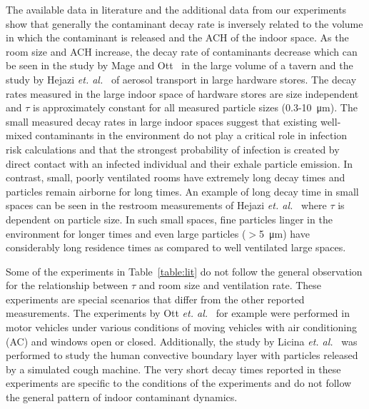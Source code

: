 \documentclass[preprint]{elsarticle}
\begin{document}
The available data in literature and the additional data from our experiments show that generally the contaminant decay rate is inversely related to the volume in which the contaminant is released and the ACH of the indoor space.
As the room size and ACH increase, the decay rate of contaminants decrease which can be seen in the study by Mage and Ott~\cite{Mage1996} in the large volume of a tavern and the study by Hejazi \textit{et. al.}~\cite{Hejazi2021} of aerosol transport in large hardware stores.
The decay rates measured in the large indoor space of hardware stores are size independent and $\tau$ is approximately constant for all measured particle sizes (0.3-\SI{10}{\micro\meter})\cite{Hejazi2021}. 
The small measured decay rates in large indoor spaces suggest that existing well-mixed contaminants in the environment do not play a critical role in infection risk calculations and that the strongest probability of infection is created by direct contact with an infected individual and their exhale particle emission.
In contrast, small, poorly ventilated rooms have extremely long decay times and particles remain airborne for long times. An example of long decay time in small spaces can be seen in the restroom measurements of Hejazi \textit{et. al.}~\cite{Hejazi2021} where $\tau$ is dependent on particle size.
In such small spaces, fine particles linger in the environment for longer times and even large particles ($>$\SI{5}{\micro\meter}) have considerably long residence times as compared to well ventilated large spaces. 

Some of the experiments in Table~\ref{table:lit} do not follow the general observation for the relationship between $\tau$ and room size and ventilation rate. These experiments are special scenarios that differ from the other reported measurements. The experiments by Ott \textit{et. al.}~\cite{Ott2008cars} for example were performed in motor vehicles under various conditions of moving vehicles with air conditioning (AC) and windows open or closed. 
Additionally, the study by Licina \textit{et. al.}~\cite{Licina2014} was performed to study the human convective boundary layer with particles released by a simulated cough machine.
The very short decay times reported in these experiments are specific to the conditions of the experiments and do not follow the general pattern of indoor contaminant dynamics.
\end{document}
